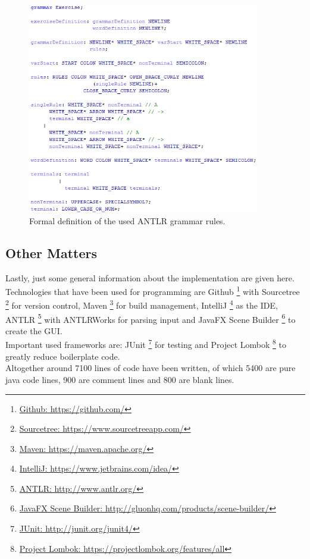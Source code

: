 \begin{figure} [h]
	\centering 
	\includegraphics[width=0.9\textwidth]{abb/antrlRules.png}
	\caption{Formal definition of the used ANTLR grammar rules.}
	\label{antlrGrammarRules}
\end{figure}

\pagebreak
\subsection{Other Matters}
Lastly, just some general information about the implementation are given here.\\
Technologies that have been used for programming are 
Github \footnote{\href{https://github.com/}{Github: https://github.com/}} with 
Sourcetree \footnote{\href{https://www.sourcetreeapp.com/}{Sourcetree: https://www.sourcetreeapp.com/}} for version control, 
Maven \footnote{\href{https://maven.apache.org/}{Maven: https://maven.apache.org/}} for build management, 
IntelliJ \footnote{\href{https://www.jetbrains.com/idea/}{IntelliJ: https://www.jetbrains.com/idea/}} as the IDE, 
ANTLR \footnote{\href{http://www.antlr.org/}{ANTLR: http://www.antlr.org/}} with ANTLRWorks for parsing input and 
JavaFX Scene Builder \footnote{\href{http://gluonhq.com/products/scene-builder/}{JavaFX Scene Builder: http://gluonhq.com/products/scene-builder/}} to create the GUI. \\
\noindent Important used frameworks are: 
JUnit \footnote{\href{http://junit.org/junit4/}{JUnit: http://junit.org/junit4/}} for testing and Project 
Lombok \footnote{\href{https://projectlombok.org/features/all}{Project Lombok: https://projectlombok.org/features/all}} to greatly reduce boilerplate code.\\
\noindent Altogether around 7100 lines of code have been written, of which 5400 are pure java code lines, 900 are comment lines and 800 are blank lines.\\ 

\pagebreak
